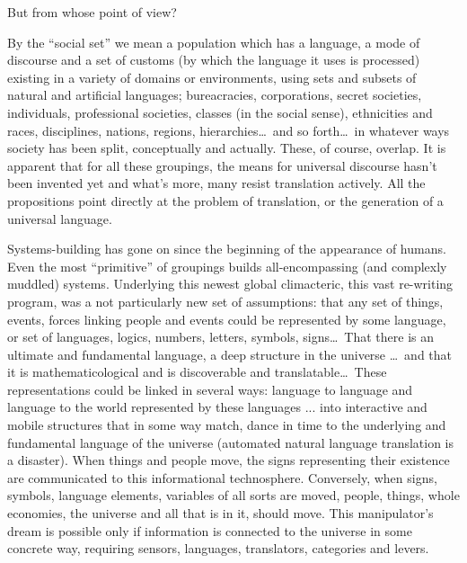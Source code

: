 \documentclass[11pt,twoside,draft]{memoir}
\begin{document}
But from whose point of view?

By the \enquote{social set} we mean a population
which has a language, a mode of discourse
and a set of customs (by which the language
it uses is processed) existing in a variety of
domains or environments, using sets and
subsets of natural and artificial languages;
bureacracies, corporations, secret societies,
individuals, professional societies, classes
(in the social sense), ethnicities and races,
disciplines, nations, regions, hierarchies\ldots\ and so forth\ldots\ in whatever ways society has
been split, conceptually and actually. These,
of course, overlap. It is apparent that for all
these groupings, the means for universal
discourse hasn't been invented yet and
what's more, many resist translation actively.
All the propositions point directly at the
problem of translation, or the generation of a
universal language.

Systems-building has gone on since the beginning of the appearance of humans.
Even the most \enquote{primitive} of groupings builds all-encompassing (and complexly
muddled) systems. Underlying this newest global climacteric, this vast re-writing program,
was a not particularly new set of assumptions: that any set of things, events,
forces linking people and events could be represented by some language, or set of
languages, logics, numbers, letters, symbols, signs\ldots\ That there is an ultimate and fundamental language, a deep structure in the
universe \ldots\ and that it is mathematicological and is discoverable and translatable\ldots\ These representations could be
linked in several ways: language to language and language to the world represented by
these languages ... into interactive and mobile structures that in some way match,
dance in time to the underlying and fundamental language of the universe (automated
natural language translation is a disaster). When things and people move, the signs
representing their existence are communicated to this informational technosphere.
Conversely, when signs, symbols, language elements, variables of all sorts are moved,
people, things, whole economies, the universe and all that is in it, should move. This
manipulator's dream is possible only if information is connected to the universe in
some concrete way, requiring sensors, languages, translators, categories and levers.
\end{document}
